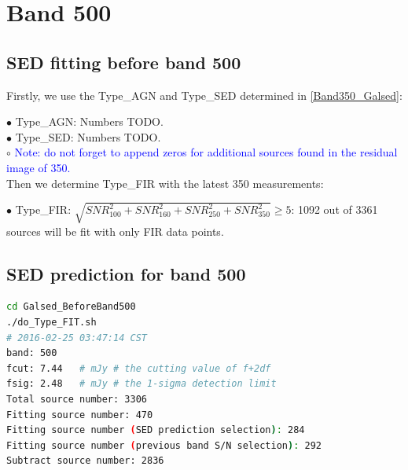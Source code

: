 \documentclass[11pt,a4paper]{article}
\begin{document}

\clearpage

\section{Band 500}

\subsection{SED fitting before band 500}
\label{Band500_Galsed}

Firstly, we use the Type\_AGN and Type\_SED determined in \ref{Band350_Galsed}:

\indent\hspace{15pt}$\bullet$ 
Type\_AGN: Numbers TODO. 
\\
\indent\hspace{15pt}$\bullet$ 
Type\_SED: Numbers TODO. 
\\
\indent\hspace{15pt}$\circ$ 
\textcolor{blue}{Note: \textcolor{blue}{do not forget} to append zeros for additional sources found in the residual image of 350.}
\\

Then we determine Type\_FIR with the latest 350 measurements:

\indent\hspace{15pt}$\bullet$ 
Type\_FIR: $\sqrt{SNR_{100}^2+SNR_{160}^2+SNR_{250}^2+SNR_{350}^2} \ge 5$: 1092 out of 3361 sources will be fit with only FIR data points. 
\\

\subsection{SED prediction for band 500}
\label{Band500_Galpre}

\begin{lstlisting}[language=bash]
cd Galsed_BeforeBand500
./do_Type_FIT.sh
# 2016-02-25 03:47:14 CST
band: 500
fcut: 7.44   # mJy # the cutting value of f+2df
fsig: 2.48   # mJy # the 1-sigma detection limit
Total source number: 3306
Fitting source number: 470
Fitting source number (SED prediction selection): 284
Fitting source number (previous band S/N selection): 292
Subtract source number: 2836
\end{lstlisting}
\end{document}
